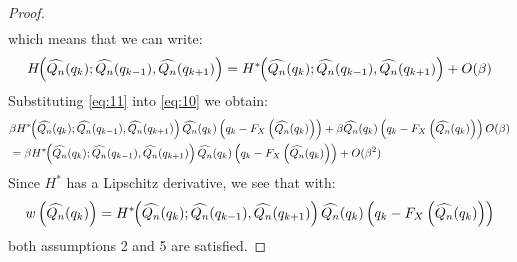 \documentclass[10pt, a4paper]{article}
\newtheorem{rational for conjecture}{Rational for Conjecture}
\begin{document}
\begin{proof}
\begin{align*}
\end{align*}
which means that we can write:
\begin{align}
  \label{eq:11}
  H\hspace{-1mm}\left(\widehat{Q_{n}}(q_{k}); \widehat{Q_{n}}(q_{k-1}), \widehat{Q_{n}}(q_{k+1}) \right) = H^{\ast}\hspace{-1mm}\left(\widehat{Q_{n}}(q_{k}); \widehat{Q_{n}}(q_{k-1}), \widehat{Q_{n}}(q_{k+1}) \right) + O(\beta)
\end{align}
Substituting \eqref{eq:11} into \eqref{eq:10} we obtain:
\begin{align*}
  &\beta H^{\ast} \hspace{-1mm}\left(\widehat{Q_{n}}(q_{k}); \widehat{Q_{n}}(q_{k-1}), \widehat{Q_{n}}(q_{k+1}) \right) \widehat{Q_{n}}(q_{k}) \left(q_k - F_X\left(\widehat{Q_{n}}(q_{k})\right)\right) + \beta \widehat{Q_{n}}(q_{k})  \left(q_k - F_X\left(\widehat{Q_{n}}(q_{k})\right)\right) O(\beta) \\
  & = \beta H^{\ast} \hspace{-1mm}\left(\widehat{Q_{n}}(q_{k}); \widehat{Q_{n}}(q_{k-1}), \widehat{Q_{n}}(q_{k+1}) \right) \widehat{Q_{n}}(q_{k}) \left(q_k - F_X\left(\widehat{Q_{n}}(q_{k})\right)\right) + O(\beta^2)
\end{align*}
Since $H^{\ast}$ has a Lipschitz derivative, we see that with:
\begin{align}
  \label{eq:14}
w\left(\widehat{Q_{n}}(q_{k})\right) = H^{\ast}\hspace{-1mm}\left(\widehat{Q_{n}}(q_{k}); \widehat{Q_{n}}(q_{k-1}), \widehat{Q_{n}}(q_{k+1}) \right) \widehat{Q_{n}}(q_{k}) \left(q_k - F_X\left(\widehat{Q_{n}}(q_{k})\right)\right)
\end{align}
both assumptions 2 and 5 are satisfied.


\end{proof}
\end{document}
